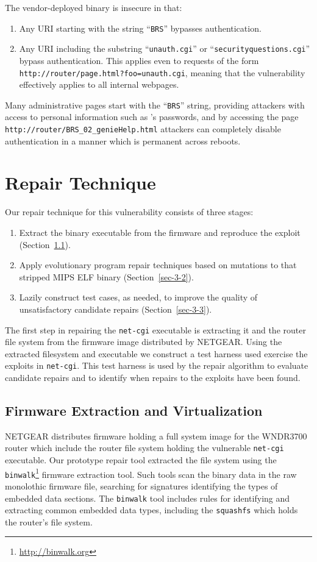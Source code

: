 \documentclass{sigcomm-alternate}
\begin{document}
The vendor-deployed binary is insecure in that: 
\begin{enumerate}
\item Any URI starting with the string ``{\tt BRS}'' bypasses authentication.

\item Any URI including the substring ``{\tt unauth.cgi}'' or
  ``{\tt securityquestions.cgi}'' bypass authentication. This applies
  even to requests of the form 
  \texttt{http://router/page.html?foo=unauth.cgi}, meaning that 
  the vulnerability effectively applies to all internal webpages. 
\end{enumerate}

Many administrative pages start with the ``{\tt BRS}'' string, providing
attackers with access to personal information such as 's
passwords, and by accessing the page
\texttt{http://router/BRS\_02\_genieHelp.html} attackers can
completely disable authentication in a manner which is permanent
across reboots.

\section{Repair Technique}
\label{sec-3}

Our repair technique for this vulnerability consists of three stages:
\begin{enumerate}
\item Extract the binary executable from the firmware and reproduce
the exploit (Section~\ref{sec-3-1}).
\item Apply evolutionary program repair techniques based on mutations to
that stripped MIPS ELF binary (Section~\ref{sec-3-2}). 
\item Lazily construct test cases, as needed, to improve the quality of
unsatisfactory candidate repairs (Section~\ref{sec-3-3}). 
\end{enumerate} 

The first step in repairing the \texttt{net-cgi} executable is extracting
it and the router file system from the firmware image distributed by
NETGEAR.  Using the extracted filesystem and executable we construct a test
harness used exercise the exploits in \texttt{net-cgi}.  This test harness
is used by the repair algorithm to evaluate candidate repairs and to
identify when repairs to the exploits have been found.

\subsection{Firmware Extraction and Virtualization}
\label{sec-3-1}
NETGEAR distributes firmware holding a full system image for the
WNDR3700 router which include the router file system holding the
vulnerable \texttt{net-cgi} executable. Our prototype repair tool
extracted the file system using the 
\texttt{binwalk}\footnote{\url{http://binwalk.org}} firmware extraction
tool. Such tools scan the binary data in the raw monolothic firmware file,
searching for signatures
identifying the types of embedded data sections.  The \texttt{binwalk} tool
includes rules for identifying and extracting common embedded data
types, including the {\tt squashfs}\cite{lougher2006squashfs} which
holds the router's file system.
\end{document}
